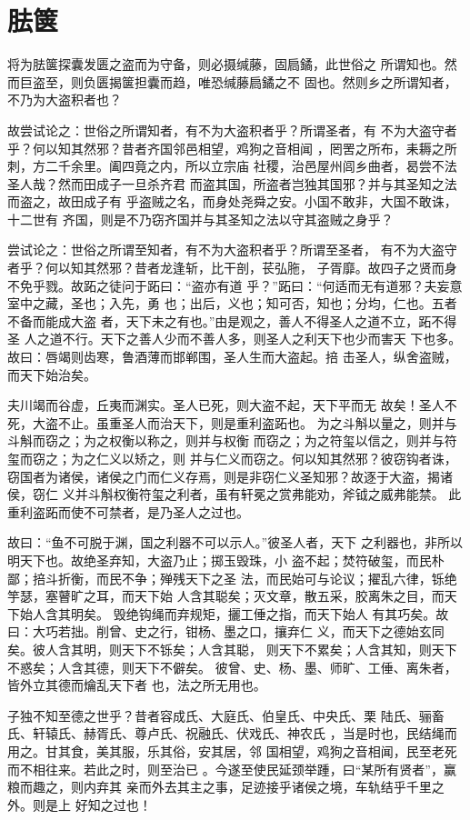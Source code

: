 \documentclass[a4paper,12pt,UTF8,twoside]{ctexbook}
\begin{document}
\section{胠箧}

将为胠箧探囊发匮之盗而为守备，则必摄缄藤，固扃鐍，此世俗之 所谓知也。然而巨盗至，则负匮揭箧担囊而趋，唯恐缄藤扃鐍之不 固也。然则乡之所谓知者，不乃为大盗积者也？

故尝试论之：世俗之所谓知者，有不为大盗积者乎？所谓圣者，有 不为大盗守者乎？何以知其然邪？昔者齐国邻邑相望，鸡狗之音相闻 ，罔罟之所布，耒耨之所刺，方二千余里。阖四竟之内，所以立宗庙 社稷，治邑屋州闾乡曲者，曷尝不法圣人哉？然而田成子一旦杀齐君 而盗其国，所盗者岂独其国邪？并与其圣知之法而盗之，故田成子有 乎盗贼之名，而身处尧舜之安。小国不敢非，大国不敢诛，十二世有 齐国，则是不乃窃齐国并与其圣知之法以守其盗贼之身乎？

尝试论之：世俗之所谓至知者，有不为大盗积者乎？所谓至圣者， 有不为大盗守者乎？何以知其然邪？昔者龙逢斩，比干剖，苌弘胣， 子胥靡。故四子之贤而身不免乎戮。故跖之徒问于跖曰：“盗亦有道 乎？”跖曰：“何适而无有道邪？夫妄意室中之藏，圣也；入先，勇 也；出后，义也；知可否，知也；分均，仁也。五者不备而能成大盗 者，天下未之有也。”由是观之，善人不得圣人之道不立，跖不得圣 人之道不行。天下之善人少而不善人多，则圣人之利天下也少而害天 下也多。故曰：唇竭则齿寒，鲁酒薄而邯郸围，圣人生而大盗起。掊 击圣人，纵舍盗贼，而天下始治矣。

夫川竭而谷虚，丘夷而渊实。圣人已死，则大盗不起，天下平而无 故矣！圣人不死，大盗不止。虽重圣人而治天下，则是重利盗跖也。 为之斗斛以量之，则并与斗斛而窃之；为之权衡以称之，则并与权衡 而窃之；为之符玺以信之，则并与符玺而窃之；为之仁义以矫之，则 并与仁义而窃之。何以知其然邪？彼窃钩者诛，窃国者为诸侯，诸侯之门而仁义存焉，则是非窃仁义圣知邪？故逐于大盗，揭诸侯，窃仁 义并斗斛权衡符玺之利者，虽有轩冕之赏弗能劝，斧钺之威弗能禁。 此重利盗跖而使不可禁者，是乃圣人之过也。

故曰：“鱼不可脱于渊，国之利器不可以示人。”彼圣人者，天下 之利器也，非所以明天下也。故绝圣弃知，大盗乃止；掷玉毁珠，小 盗不起；焚符破玺，而民朴鄙；掊斗折衡，而民不争；殚残天下之圣 法，而民始可与论议；擢乱六律，铄绝竽瑟，塞瞽旷之耳，而天下始 人含其聪矣；灭文章，散五采，胶离朱之目，而天下始人含其明矣。 毁绝钩绳而弃规矩，攦工倕之指，而天下始人 有其巧矣。故曰：大巧若拙。削曾、史之行，钳杨、墨之口，攘弃仁 义，而天下之德始玄同矣。彼人含其明，则天下不铄矣；人含其聪， 则天下不累矣；人含其知，则天下不惑矣；人含其德，则天下不僻矣。 彼曾、史、杨、墨、师旷、工倕、离朱者，皆外立其德而爚乱天下者 也，法之所无用也。

子独不知至德之世乎？昔者容成氏、大庭氏、伯皇氏、中央氏、栗 陆氏、骊畜氏、轩辕氏、赫胥氏、尊卢氏、祝融氏、伏戏氏、神农氏 ，当是时也，民结绳而用之。甘其食，美其服，乐其俗，安其居，邻 国相望，鸡狗之音相闻，民至老死而不相往来。若此之时，则至治已 。今遂至使民延颈举踵，曰“某所有贤者”，赢粮而趣之，则内弃其 亲而外去其主之事，足迹接乎诸侯之境，车轨结乎千里之外。则是上 好知之过也！
\end{document}
